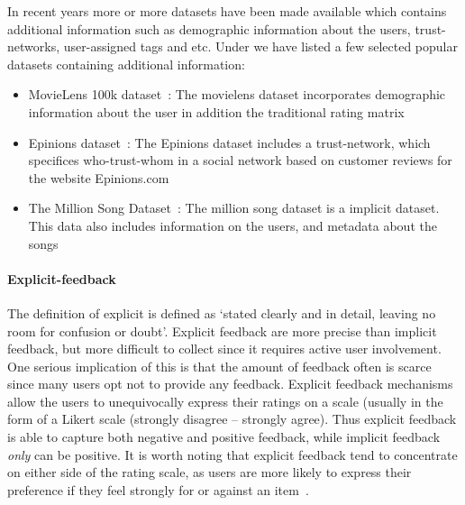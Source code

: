 In recent years more or more datasets have been made available which contains
additional information such as demographic information about the users,
trust-networks, user-assigned tags and etc. Under we have listed a few selected
popular datasets containing additional information:


\begin{itemize}

\item MovieLens 100k dataset~\cite{Movielens}: The movielens dataset
	incorporates demographic information about the user in addition the
	traditional rating matrix

\item Epinions dataset~\cite{Epinions}: The Epinions dataset includes a
	trust-network, which specifices who-trust-whom in a social network based on
	customer reviews for the website Epinions.com

\item The Million Song Dataset~\cite{Bertin-Mahieux2011}: The million song
	dataset is a implicit dataset. This data also includes information on the users,
	and metadata about the songs
\end{itemize}

\paragraph{Explicit-feedback}
The definition of explicit is defined as `stated clearly and in detail, leaving
no room for confusion or doubt'. Explicit feedback are more precise than
implicit feedback, but more difficult to collect since it requires active user
involvement. One serious implication of this is that the amount of feedback
often is scarce since many users opt not to provide any feedback. Explicit
feedback mechanisms allow the users to unequivocally express their ratings on a
scale (usually in the form of a Likert scale (strongly disagree – strongly
agree). Thus explicit feedback is able to capture both negative and positive
feedback, while implicit feedback \emph{only} can be positive. It is worth
noting that explicit feedback tend to concentrate on either side of the rating
scale, as users are more likely to express their preference if they feel
strongly for or against an item~\cite{Jawaheer2010}.

